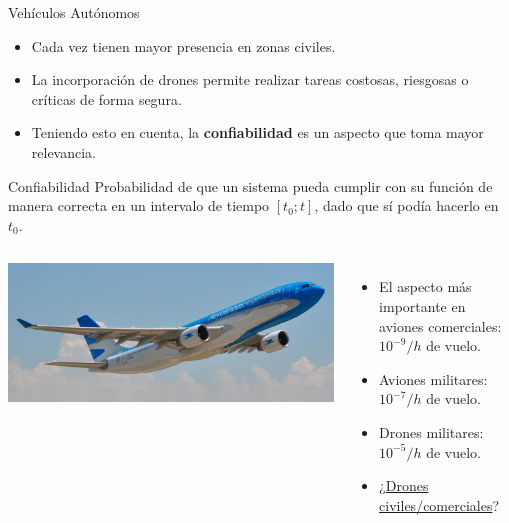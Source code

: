 \begin{frame}{Vehículos Autónomos}
	\begin{itemize}
		\item Cada vez tienen mayor presencia en zonas civiles.
		\item La incorporación de drones permite realizar tareas costosas,  riesgosas o críticas de forma segura.
		\item Teniendo esto en cuenta, la \textbf{confiabilidad} es un aspecto que toma mayor relevancia.
	\end{itemize}
    \begin{block}{Confiabilidad}
    	Probabilidad de que un sistema pueda cumplir con su función de manera correcta en un intervalo de tiempo $\left[t_0;t\right]$, dado que sí podía hacerlo en $t_0$.
    \end{block}
    \begin{columns}
			\includegraphics[width=\textwidth]{img/avion_comercial.jpg}
            \begin{itemize}
            	\item El aspecto más importante en aviones comerciales: $10^{-9}/h$ de vuelo.
            	\item Aviones militares: $10^{-7}/h$ de vuelo.
            	\item Drones militares: $10^{-5}/h$ de vuelo.
            	\item ¿\underline{Drones civiles/comerciales}?
            \end{itemize}
    \end{columns}
\end{frame}

